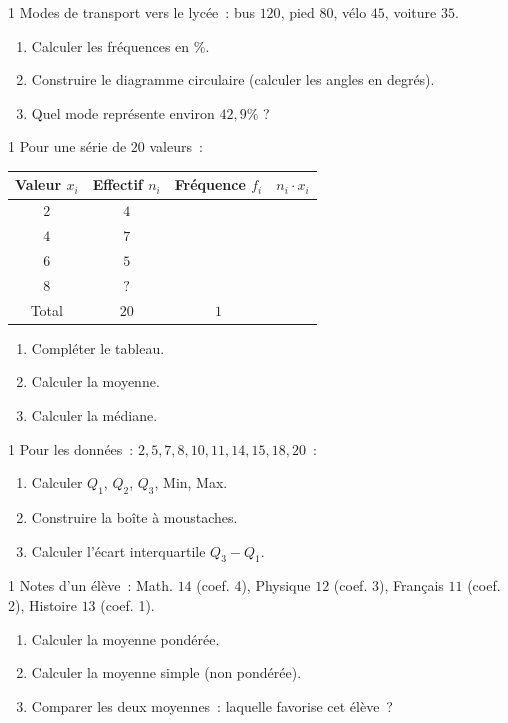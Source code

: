 \begin{exo}{1}
Modes de transport vers le lyc\'ee~:
bus $120$, pied $80$, v\'elo $45$, voiture $35$.
\begin{enumerate}
  \item Calculer les fr\'equences en \%.
  \item Construire le diagramme circulaire (calculer les angles en degr\'es).
  \item Quel mode repr\'esente environ $42{,}9\%$ ?
\end{enumerate}
\end{exo}

\begin{exo}{1}
Pour une s\'erie de $20$ valeurs~:
\begin{center}
\begin{tabular}{|c|c|c|c|}
\hline
\rowcolor{BN!10}
Valeur $x_i$ & Effectif $n_i$ & Fr\'equence $f_i$ & $n_i\cdot x_i$ \\
\hline
$2$ & $4$ & & \\
$4$ & $7$ & & \\
$6$ & $5$ & & \\
$8$ & $?$ & & \\
\hline
Total & $20$ & $1$ & \\
\hline
\end{tabular}
\end{center}
\begin{enumerate}
  \item Compl\'eter le tableau.
  \item Calculer la moyenne.
  \item Calculer la m\'ediane.
\end{enumerate}
\end{exo}

\begin{exo}{1}
Pour les donn\'ees~: $2, 5, 7, 8, 10, 11, 14, 15, 18, 20$~:
\begin{enumerate}
  \item Calculer $Q_1$, $Q_2$, $Q_3$, Min, Max.
  \item Construire la bo\^ite \`a moustaches.
  \item Calculer l'\'ecart interquartile $Q_3-Q_1$.
\end{enumerate}
\end{exo}

\begin{exo}{1}
Notes d'un \'el\`eve~:
Math. $14$ (coef. 4), Physique $12$ (coef. 3), Fran\c cais $11$ (coef. 2),
Histoire $13$ (coef. 1).
\begin{enumerate}
  \item Calculer la moyenne pond\'er\'ee.
  \item Calculer la moyenne simple (non pond\'er\'ee).
  \item Comparer les deux moyennes~: laquelle favorise cet \'el\`eve~?
\end{enumerate}
\end{exo}

